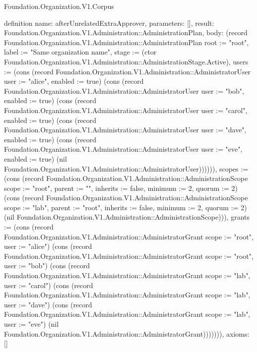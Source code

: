 \begin{lexlean}{Foundation.Organization.V1.Corpus}
\begin{semanticmodule}
definition{
  name: afterUnrelatedExtraApprover,
  parameters: [],
  result: Foundation.Organization.V1.Administration::AdministrationPlan,
  body: (record Foundation.Organization.V1.Administration::AdministrationPlan {root := "root", label := "Same organization name", stage := (ctor Foundation.Organization.V1.Administration::AdministrationStage.Active), users := (cons (record Foundation.Organization.V1.Administration::AdministratorUser {user := "alice", enabled := true}) (cons (record Foundation.Organization.V1.Administration::AdministratorUser {user := "bob", enabled := true}) (cons (record Foundation.Organization.V1.Administration::AdministratorUser {user := "carol", enabled := true}) (cons (record Foundation.Organization.V1.Administration::AdministratorUser {user := "dave", enabled := true}) (cons (record Foundation.Organization.V1.Administration::AdministratorUser {user := "eve", enabled := true}) (nil Foundation.Organization.V1.Administration::AdministratorUser)))))), scopes := (cons (record Foundation.Organization.V1.Administration::AdministrationScope {scope := "root", parent := "", inherits := false, minimum := 2, quorum := 2}) (cons (record Foundation.Organization.V1.Administration::AdministrationScope {scope := "lab", parent := "root", inherits := false, minimum := 2, quorum := 2}) (nil Foundation.Organization.V1.Administration::AdministrationScope))), grants := (cons (record Foundation.Organization.V1.Administration::AdministratorGrant {scope := "root", user := "alice"}) (cons (record Foundation.Organization.V1.Administration::AdministratorGrant {scope := "root", user := "bob"}) (cons (record Foundation.Organization.V1.Administration::AdministratorGrant {scope := "lab", user := "carol"}) (cons (record Foundation.Organization.V1.Administration::AdministratorGrant {scope := "lab", user := "dave"}) (cons (record Foundation.Organization.V1.Administration::AdministratorGrant {scope := "lab", user := "eve"}) (nil Foundation.Organization.V1.Administration::AdministratorGrant))))))}),
  axioms: []
}


\end{semanticmodule}
\end{lexlean}
